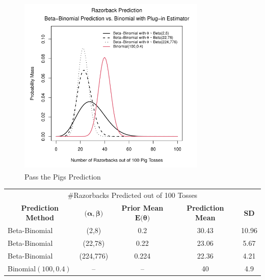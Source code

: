 \documentclass[12pt, a4paper]{article}
\begin{document}
\vspace{1cm}

\begin{figure}[ht]
  \centering
  \includegraphics[width=0.8\textwidth]{./Graphics/PassThePigs/PTP_BBplot}
  \caption{Pass the Pigs\textsuperscript{\circledR} Prediction}
  \label{fig:PtPBB}
\end{figure}

\vspace{2cm}


\vspace{1cm}

\begin{center}
  \begin{tabular}{l c c c c }
  \toprule
  \multicolumn{5}{c}{\large \#Razorbacks Predicted out of 100 Tosses}          \\
  \multicolumn{1}{c}{\textbf{Prediction Method}} & \multicolumn{1}{c}{$\textbf{(}\boldsymbol\alpha,\boldsymbol\beta\textbf{)}$}  & \multicolumn{1}{c}{\textbf{Prior Mean }$\textbf{E(}\boldsymbol\theta\textbf{)}$}  & \multicolumn{1}{c}{\textbf{Prediction Mean}} & \multicolumn{1}{c}{\textbf{SD}}\\
        \midrule
        Beta-Binomial & (2,8) & 0.2 & 30.43 & 10.96 \\
        \midrule
        Beta-Binomial & (22,78) & 0.22 & 23.06 & 5.67\\
        \midrule
        Beta-Binomial & (224,776) & 0.224 & 22.36 & 4.21 \\
        \midrule
        Binomial$(100,0.4)$ & -- & -- & 40 & 4.9 \\
  \bottomrule
  \end{tabular}
\end{center}
\end{document}

